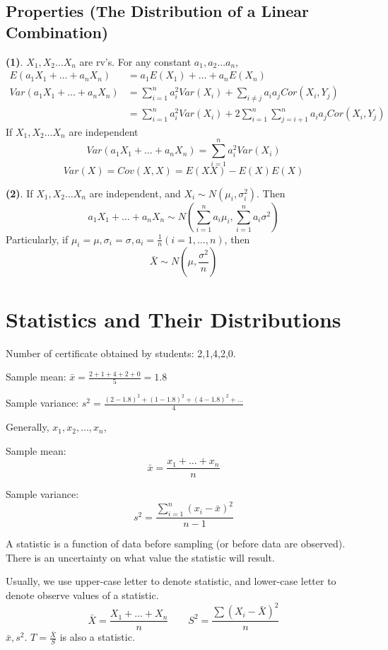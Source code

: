\subsection{Properties (The Distribution of a Linear Combination)}
\begin{prop}
\textbf{(1)}. $X_1,X_2 \dots X_n$ are rv's. For any constant $a_1,a_2 \dots a_n$,
\begin{align*}
E(a_1 X_1+\dots+a_n X_n)&=a_1E(X_1)+\dots +a_n E(X_n)\\
Var(a_1 X_1+\dots+a_n X_n)&=\sum_{i=1}^n a_i^2 Var(X_i)+\sum_{i\neq j} a_i a_j Cor(X_i,Y_j)\\
&=\sum_{i=1}^n a_i^2 Var(X_i)+2\sum_{i=1}^{n}\sum_{j=i+1}^{n} a_i a_j Cor(X_i,Y_j)
\end{align*}
If $X_1,X_2 \dots X_n$ are independent
\[Var(a_1 X_1+\dots+a_n X_n)=\sum_{i=1}^n a_i^2 Var(X_i)\]
\[Var(X)=Cov(X,X)=E(XX)-E(X)E(X)\]

\textbf{(2)}. If $X_1,X_2 \dots X_n$ are independent, and $X_i\sim N(\mu_i,\sigma_i^2)$. Then
\[a_1 X_1+\dots+a_n X_n \sim N(\sum_{i=1}^{n} a_i \mu_i,\sum_{i=1}^{n} a_i \sigma^2)\]
Particularly, if $\mu_i=\mu, \sigma_i=\sigma ,a_i=\frac{1}{n}(i=1,\dots,n)$, then
\[\bar{X} \sim N(\mu,\frac{\sigma^2}{n})\]
\end{prop}

\section{Statistics and Their Distributions}
\begin{exmp}
Number of certificate obtained by students: 2,1,4,2,0. 

Sample mean: $\bar{x}=\frac{2+1+4+2+0}{5}=1.8$

Sample variance: $s^2=\frac{(2-1.8)^2+(1-1.8)^2+(4-1.8)^2+\dots}{4}$

Generally, $x_1,x_2,\dots,x_n$,

Sample mean:\[\bar{x}=\frac{x_1+\dots+x_n}{n}\]

Sample variance:\[s^2=\frac{\sum_{i=1}^n (x_i-\bar{x})^2}{n-1}\]
\end{exmp}


\begin{defn}
A statistic is a function of data before sampling (or before data are observed). There is an uncertainty on what value the statistic will result.

Usually, we use upper-case letter to denote statistic, and lower-case letter to denote observe values of a statistic.
\[\bar{X}= \frac{X_1+\dots+X_n}{n} \qquad S^2=\frac{\sum (X_i-\bar{X})^2}{n}\]
$\bar{x},s^2$. $T=\frac{\bar{X}}{S}$ is also a statistic.
\end{defn}


